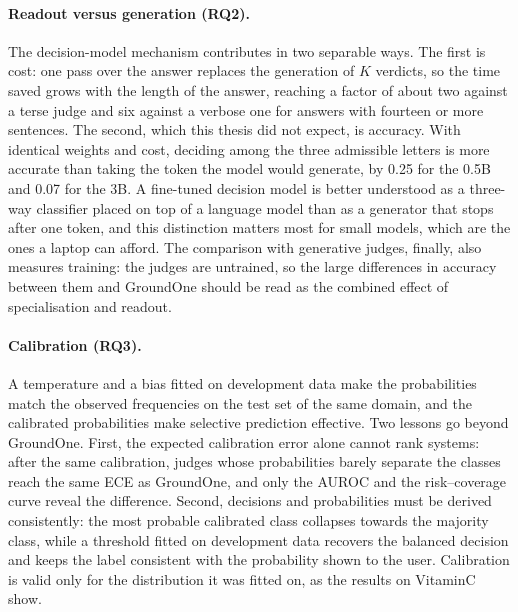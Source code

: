 \paragraph{Readout versus generation (RQ2).} The decision-model mechanism contributes in two separable ways. The first is
cost: one pass over the answer replaces the generation of $K$ verdicts, so the time saved grows with the length of the
answer, reaching a factor of about two against a terse judge and six against a verbose one for answers with fourteen or
more sentences. The second, which this thesis did not expect, is accuracy. With identical weights and cost, deciding
among the three admissible letters is more accurate than taking the token the model would generate, by 0.25 for the
0.5B and 0.07 for the 3B. A fine-tuned decision model is better understood as a three-way classifier placed on top of a
language model than as a generator that stops after one token, and this distinction matters most for small models,
which are the ones a laptop can afford. The comparison with generative judges, finally, also measures training: the
judges are untrained, so the large differences in accuracy between them and GroundOne should be read as the combined
effect of specialisation and readout.

\paragraph{Calibration (RQ3).} A temperature and a bias fitted on development data make the probabilities match the
observed frequencies on the test set of the same domain, and the calibrated probabilities make selective prediction
effective. Two lessons go beyond GroundOne. First, the expected calibration error alone cannot rank systems: after the
same calibration, judges whose probabilities barely separate the classes reach the same ECE as GroundOne, and only the
AUROC and the risk--coverage curve reveal the difference. Second, decisions and probabilities must be derived
consistently: the most probable calibrated class collapses towards the majority class, while a threshold fitted on
development data recovers the balanced decision and keeps the label consistent with the probability shown to the user.
Calibration is valid only for the distribution it was fitted on, as the results on VitaminC show.

